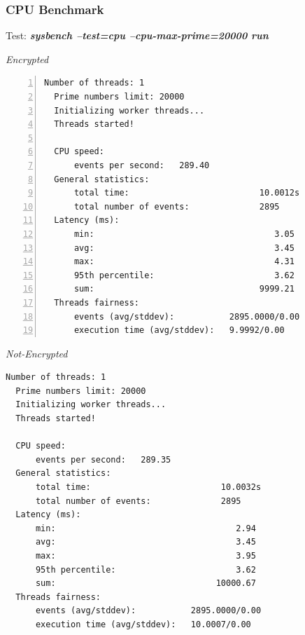 \subsubsection{CPU Benchmark}
\begin{center}
  Test: \textbf{\textit{sysbench --test=cpu --cpu-max-prime=20000 run}}  
\end{center}
\vspace*{-\baselineskip}
\noindent\begin{minipage}[t]{0.45\linewidth}
  \centering
  \textit{Encrypted}
  \begin{lstlisting}[basicstyle=\tiny,frame=single, numbers=left, label=cpu_test1]
  Number of threads: 1
  Prime numbers limit: 20000
  Initializing worker threads...
  Threads started!
  
  CPU speed:
      events per second:   289.40
  General statistics:
      total time:                          10.0012s
      total number of events:              2895
  Latency (ms):
      min:                                    3.05
      avg:                                    3.45
      max:                                    4.31
      95th percentile:                        3.62
      sum:                                 9999.21
  Threads fairness:
      events (avg/stddev):           2895.0000/0.00
      execution time (avg/stddev):   9.9992/0.00
  \end{lstlisting}
\end{minipage}
\hspace{0.5cm}
\noindent\begin{minipage}[t]{0.45\linewidth}
  \centering
  \textit{Not-Encrypted}
  \begin{lstlisting}[basicstyle=\tiny,frame=single, label=cpu_test2]
  Number of threads: 1
  Prime numbers limit: 20000
  Initializing worker threads...
  Threads started!
  
  CPU speed:
      events per second:   289.35
  General statistics:
      total time:                          10.0032s
      total number of events:              2895
  Latency (ms):
      min:                                    2.94
      avg:                                    3.45
      max:                                    3.95
      95th percentile:                        3.62
      sum:                                10000.67
  Threads fairness:
      events (avg/stddev):           2895.0000/0.00
      execution time (avg/stddev):   10.0007/0.00
  \end{lstlisting}
\end{minipage}

